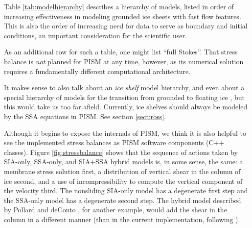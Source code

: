 \documentclass[titlepage,letterpaper,final]{scrartcl}
\begin{document}
Table \ref{tab:modelhierarchy} describes a hierarchy of models, listed in order of increasing effectiveness in modeling grounded ice sheets with fast flow features.  This is also the order of increasing need for data to serve as boundary and initial conditions, an important consideration for the scientific user.

As an additional row for such a table, one might list ``full Stokes''.  That stress balance is \emph{not} planned for PISM at any time, however, as its numerical solution requires a fundamentally different computational architecture.

It makes sense to also talk about an \emph{ice shelf} model hierarchy, and even about a special hierarchy of models for the transition from grounded to floating ice \cite{SchoofMarine1}, but this would take us too far afield.  Currently, ice shelves should always be modeled by the SSA equations in PISM.  See section \ref{sect:ross}.

Although it begins to expose the internals of PISM, we think it is also helpful to see the implemented stress balances as PISM software components (C++ classes).  Figure \ref{fig:stressbalance} shows that the sequence of actions taken by SIA-only, SSA-only, and SIA+SSA hybrid models is, in some sense, the same: a membrane stress solution first, a distribution of vertical shear in the column of ice second, and a use of incompressibility to compute the vertical component of the velocity third.  The nonsliding SIA-only model has a degenerate first step and the SSA-only model has a degenerate second step.  The hybrid model described by Pollard and deConto \cite{PollardDeConto}, for another example, would add the shear in the column in a different manner (than in the current implementation, following \cite{BBssasliding,Winkelmannetal2011}).

\newenvironment{tightlist}{\begin{itemize}  \vspace{-0.15in}\addtolength{\itemsep}{-0.5\baselineskip} } {\vspace{-0.1in} \end{itemize}}

\newcommand{\nolist}[1]{[\emph{#1}] \vspace{0.1in}}
\end{document}

